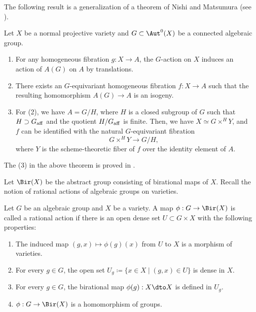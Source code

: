 \documentclass[11pt]{amsart}
\begin{document}
The following result is a generalization of a theorem of Nishi and Matsumura (see \cite[Theorem 2]{Mat63}).

\begin{theorem}\label{thm: group action}
Let $X$ be a normal projective variety and $G \subset \Aut^0(X)$ be a connected algebraic group.
\begin{enumerate}
\item For any homogeneous fibration $g: X \to A$, the $G$-action on $X$ induces an action of $A(G)$ on $A$ by translations.
\item There exists an $G$-equivariant homogeneous fibration $f: X \to A$ such that the resulting homomorphism $A(G) \to A$ is an isogeny.

\item For (2), we have $A = G/H$, where $H$ is a closed subgroup of $G$ such that $H \supset G_{\rm aff}$ and the quotient $H/G_{\rm aff}$ is finite. Then, we have $X \simeq G \times^H Y$, and $f$ can be identified with the natural $G$-equivariant fibration
\[
G \times^H Y \to G/H,
\]
where $Y$ is the scheme-theoretic fiber of $f$ over the identity element of $A$.
\end{enumerate}
\end{theorem}

\begin{remark}
The (3) in the above theorem is proved in \cite[\S 2.5, Page 97-98]{Bri17}.
\end{remark}

Let $\Bir(X)$ be the abstract group consisting of birational maps of $X$. Recall the notion of rational actions of algebraic groups on varieties.

\begin{definition}\label{def: rational action}
Let $G$ be an algebraic group and $X$ be a variety. A map $\phi: G \to \Bir(X)$ is called a rational action if there is an open dense set $U \subset G \times X$ with the following properties:
\begin{enumerate}
\item The induced map $(g, x) \mapsto \phi(g)(x)$ from $U$ to $X$ is a morphism of varieties.
\item For every $g\in G$, the open set $U_g \coloneqq \{x \in X \mid (g, x) \in U\}$ is dense in $X$.
\item For every $g \in G$, the birational map $\phi(g): X \dto X$ is defined in $U_g$. 
\item $\phi: G \to \Bir(X)$ is a homomorphism of groups.
\end{enumerate}
\end{definition}
\end{document}
